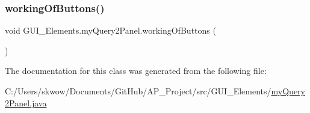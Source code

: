 \hypertarget{class_g_u_i___elements_1_1my_query2_panel_afed162247688600c698720b4ed2351c7}{}\label{class_g_u_i___elements_1_1my_query2_panel_afed162247688600c698720b4ed2351c7} 
\subsubsection{\texorpdfstring{working\+Of\+Buttons()}{workingOfButtons()}}
{\footnotesize\ttfamily void G\+U\+I\+\_\+\+Elements.\+my\+Query2\+Panel.\+working\+Of\+Buttons (\begin{DoxyParamCaption}{ }\end{DoxyParamCaption})}



The documentation for this class was generated from the following file\+:\begin{DoxyCompactItemize}
\item 
C\+:/\+Users/skwow/\+Documents/\+Git\+Hub/\+A\+P\+\_\+\+Project/src/\+G\+U\+I\+\_\+\+Elements/\hyperlink{my_query2_panel_8java}{my\+Query2\+Panel.\+java}\end{DoxyCompactItemize}
